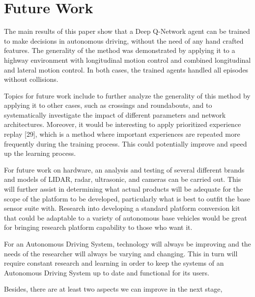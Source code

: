 \chapter{Future Work}

The main results of this paper show that a Deep Q-Network agent can be trained to make decisions in autonomous driving, without the need of any hand crafted features. The generality of the method was demonstrated by applying it to a highway environment with longitudinal motion control and combined longitudinal and lateral motion control. In both cases, the trained agents handled all episodes without collisions. %

Topics for future work include to further analyze the generality of this method by applying it to other cases, such as crossings and roundabouts, and to systematically investigate the impact of different parameters and network architectures. Moreover, it would be interesting to apply prioritized experience replay [29], which is a method where important experiences are repeated more frequently during the training process. This could potentially improve and speed up the learning process.

For future work on hardware, an analysis and testing of several different brands and models of LIDAR, radar, ultrasonic, and cameras can be carried out. This will further assist in determining what actual products will be adequate for the scope of the platform to be developed, particularly what is best to outfit the base sensor suite with. Research into developing a standard platform conversion kit that could be adaptable to a variety of autonomous base vehicles would be great for bringing research platform capability to those who want it.

For an Autonomous Driving System, technology will always be improving and the needs of the researcher will always be varying and changing. This in turn will require constant research and learning in order to keep the systems of an Autonomous Driving System up to date and functional for its users.

Besides, there are at least two aspects we can improve in the next stage,

